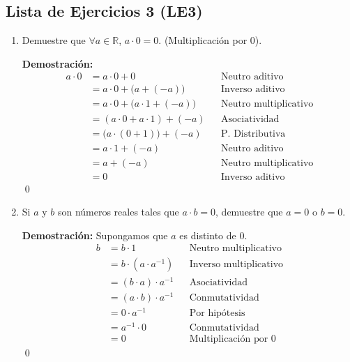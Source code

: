 \documentclass[11pt]{article}
\newcommand{\R}{\mathbb{R}}
\begin{document}
\subsection*{Lista de Ejercicios 3 (LE3)}
    \begin{enumerate}[label=\alph*)]

        \item Demuestre que $\forall a\in \R$, $a \cdot 0 = 0$. (Multiplicación por $0$).
        
        \textbf{Demostración:} \begin{align*}
            a\cdot0&=a\cdot0+0 && \text{Neutro aditivo}\\
            &=a\cdot0+\bigl(a+\left(-a\right)\bigr) && \text{Inverso aditivo}\\
            &=a\cdot0+\bigl(a\cdot1+\left(-a\right)\bigr) && \text{Neutro multiplicativo}\\
            &=\left(a\cdot0+a\cdot1\right)+\left(-a\right) && \text{Asociatividad}\\
            &=\bigl(a\cdot\left(0+1\right)\bigr)+\left(-a\right) && \text{P. Distributiva}\\
            &=a\cdot1+\left(-a\right) && \text{Neutro aditivo}\\
            &=a+\left(-a\right) && \text{Neutro multiplicativo}\\
            &=0 && \text{Inverso aditivo}
        \end{align*} \qed

\pagebreak

        \item Si $a$ y $b$ son números reales tales que $ a \cdot b = 0 $, demuestre que $a=0$ o $b=0$.
        
        \textbf{Demostración:} Supongamos que $a$ es distinto de $0$.
        \begin{align*}
            b &= b \cdot 1	&& \text{Neutro multiplicativo} \\
            &= b \cdot  \left(a \cdot a^{-1}  \right) 	&& \text{Inverso multiplicativo} \\
            &= \left(b\cdot a\right)  \cdot a^{-1}	&& \text{Asociatividad} \\
            &= \left(a\cdot b\right)  \cdot a^{-1}	&& \text{Conmutatividad} \\
            &= 0 \cdot a^{-1}	&& \text{Por hipótesis}\\
            &= a^{-1} \cdot 0	&& \text{Conmutatividad}\\
            &= 0 && \text{Multiplicación por $0$}
        \end{align*} \qed


\end{enumerate}
\end{document}
